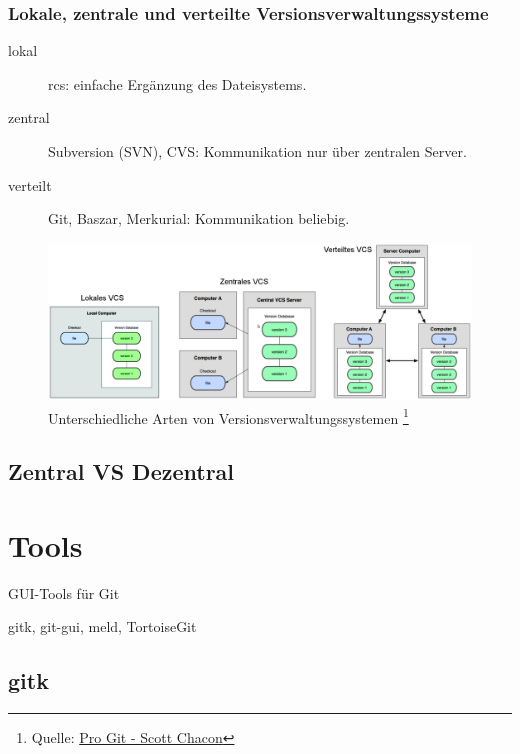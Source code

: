 \documentclass{beamer}
\begin{document}
\begin{frame}\frametitle{Lokale, zentrale und verteilte Versionsverwaltungssysteme}
\begin{description}
\item[lokal] rcs: einfache Ergänzung des Dateisystems.
\item[zentral] Subversion (SVN), CVS: Kommunikation nur über zentralen Server.
\item[verteilt] Git, Baszar, Merkurial: Kommunikation beliebig.

\end{description}

\begin{figure}
\includegraphics[scale=.15]{Bilder/VCSArten}
\caption{Unterschiedliche Arten von Versionsverwaltungssystemen
 \footnote{Quelle: \href{http://progit.org/}{Pro Git - Scott Chacon}}}
\end{figure}
\end{frame}

\subsection{Zentral VS Dezentral}


\section{Tools}
\begin{frame}[c]
\begin{center}
\begin{Huge}
GUI-Tools für Git
\end{Huge}

gitk, git-gui, meld, TortoiseGit
\end{center}
\end{frame}


\subsection{gitk}
\end{document}
